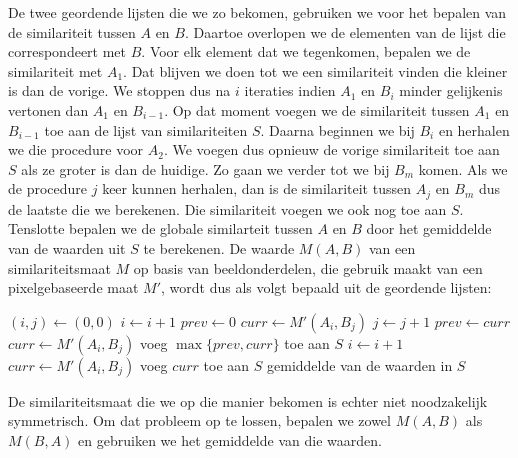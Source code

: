 De twee geordende lijsten die we zo bekomen, gebruiken we voor het bepalen van 
de similariteit tussen $A$ en $B$. Daartoe overlopen we de elementen van de 
lijst die correspondeert met $B$. Voor
elk element dat we tegenkomen, bepalen we de similariteit met $A_1$. Dat blijven we doen
tot we een similariteit vinden die kleiner is dan de vorige. We stoppen dus na $i$ iteraties 
indien $A_1$ en $B_i$ minder gelijkenis vertonen dan $A_1$ en $B_{i-1}$. Op dat moment voegen
we de similariteit tussen $A_1$ en $B_{i-1}$ toe aan de lijst van similariteiten $S$. Daarna
beginnen we bij $B_i$ en herhalen we die procedure voor $A_2$. We voegen dus opnieuw de vorige
similariteit toe aan $S$ als ze groter is dan de huidige. Zo gaan we verder tot we bij
$B_m$ komen. Als we de procedure $j$ keer kunnen herhalen, dan
is de similariteit tussen $A_j$ en $B_m$ dus de laatste die we berekenen. Die similariteit
voegen we ook nog toe aan $S$. Tenslotte bepalen we de globale similarteit tussen $A$ en $B$ 
door het gemiddelde van de waarden uit $S$ te berekenen. De waarde $M(A,B)$ van een 
similariteitsmaat $M$ op basis van beeldonderdelen, die gebruik maakt van een 
pixelgebaseerde maat $M'$, wordt dus als volgt bepaald uit de geordende lijsten:
\begin{multicols}{2}
\begin{algorithmic}[1]
\STATE $(i,j) \leftarrow (0,0)$
\STATE $i \leftarrow i+1$
\STATE $prev \leftarrow 0$
\STATE $curr \leftarrow M'(A_i,B_j)$
\STATE $j \leftarrow j+1$
\STATE $prev \leftarrow curr$
\STATE $curr \leftarrow M'(A_i,B_j)$
\ENDWHILE
\STATE voeg $\max \{prev, curr\}$ toe aan $S$
\ENDWHILE
{}
\STATE $i \leftarrow i+1$
\STATE $curr \leftarrow M'(A_i,B_j)$
\STATE voeg $curr$ toe aan $S$
\ENDIF
\RETURN gemiddelde van de waarden in $S$
\end{algorithmic}
\end{multicols}
\noindent
De similariteitsmaat die we op die manier bekomen is echter niet noodzakelijk symmetrisch. Om dat 
probleem op te lossen, bepalen we zowel $M(A,B)$ als $M(B,A)$ en gebruiken we het gemiddelde van 
die waarden.

